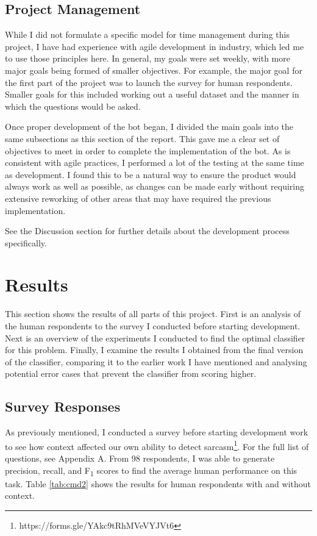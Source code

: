 \documentclass[a4paper,12pt]{article}
\begin{document}
\subsection{Project Management}
While I did not formulate a specific model for time management during this project, I have had experience with agile development in industry, which led me to use those principles here. In general, my goals were set weekly, with more major goals being formed of smaller objectives. For example, the major goal for the first part of the project was to launch the survey for human respondents. Smaller goals for this included working out a useful dataset and the manner in which the questions would be asked.

Once proper development of the bot began, I divided the main goals into the same subsections as this section of the report. This gave me a clear set of objectives to meet in order to complete the implementation of the bot. As is consistent with agile practices, I performed a lot of the testing at the same time as development. I found this to be a natural way to ensure the product would always work as well as possible, as changes can be made early without requiring extensive reworking of other areas that may have required the previous implementation.

See the Discussion section for further details about the development process specifically.

\section{Results}
This section shows the results of all parts of this project. First is an analysis of the human respondents to the survey I conducted before starting development. Next is an overview of the experiments I conducted to find the optimal classifier for this problem. Finally, I examine the results I obtained from the final version of the classifier, comparing it to the earlier work I have mentioned and analysing potential error cases that prevent the classifier from scoring higher.

\subsection{Survey Responses}
As previously mentioned, I conducted a survey before starting development work to see how context affected our own ability to detect sarcasm\footnote{https://forms.gle/YAkc9tRhMVeVYJVt6}. For the full list of questions, see Appendix A. From 98 respondents, I was able to generate precision, recall, and F\textsubscript{1} scores to find the average human performance on this task. Table \ref{tab:cmd2} shows the results for human respondents with and without context.
\end{document}
